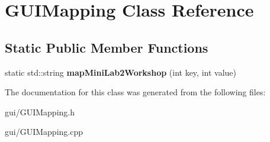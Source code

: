 \hypertarget{classGUIMapping}{}\section{G\+U\+I\+Mapping Class Reference}
\label{classGUIMapping}
\subsection*{Static Public Member Functions}
\begin{DoxyCompactItemize}
\item 
static std\+::string {\bfseries map\+Mini\+Lab2\+Workshop} (int key, int value)\hypertarget{classGUIMapping_afc4d931e878ba22a7530d39c66c3a966}{}\label{classGUIMapping_afc4d931e878ba22a7530d39c66c3a966}

\end{DoxyCompactItemize}


The documentation for this class was generated from the following files\+:\begin{DoxyCompactItemize}
\item 
gui/G\+U\+I\+Mapping.\+h\item 
gui/G\+U\+I\+Mapping.\+cpp\end{DoxyCompactItemize}
